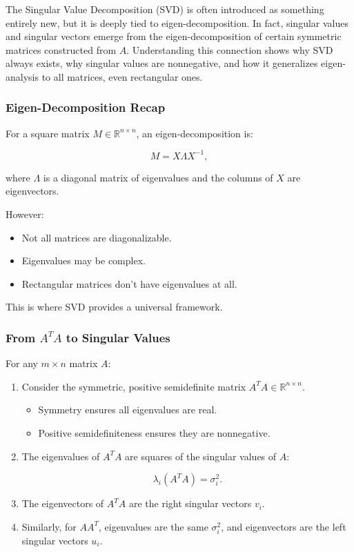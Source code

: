 \documentclass[
  letterpaper,
  DIV=11,
  numbers=noendperiod]{scrreprt}
\providecommand{\tightlist}{%
  \setlength{\itemsep}{0pt}\setlength{\parskip}{0pt}}
\begin{document}
The Singular Value Decomposition (SVD) is often introduced as something
entirely new, but it is deeply tied to eigen-decomposition. In fact,
singular values and singular vectors emerge from the eigen-decomposition
of certain symmetric matrices constructed from \(A\). Understanding this
connection shows why SVD always exists, why singular values are
nonnegative, and how it generalizes eigen-analysis to all matrices, even
rectangular ones.

\subsubsection{Eigen-Decomposition
Recap}\label{eigen-decomposition-recap}

For a square matrix \(M \in \mathbb{R}^{n \times n}\), an
eigen-decomposition is:

\[
M = X \Lambda X^{-1},
\]

where \(\Lambda\) is a diagonal matrix of eigenvalues and the columns of
\(X\) are eigenvectors.

However:

\begin{itemize}
\tightlist
\item
  Not all matrices are diagonalizable.
\item
  Eigenvalues may be complex.
\item
  Rectangular matrices don't have eigenvalues at all.
\end{itemize}

This is where SVD provides a universal framework.

\subsubsection{\texorpdfstring{From \(A^T A\) to Singular
Values}{From A\^{}T A to Singular Values}}\label{from-at-a-to-singular-values}

For any \(m \times n\) matrix \(A\):

\begin{enumerate}
\def\labelenumi{\arabic{enumi}.}
\item
  Consider the symmetric, positive semidefinite matrix
  \(A^T A \in \mathbb{R}^{n \times n}\).

  \begin{itemize}
  \tightlist
  \item
    Symmetry ensures all eigenvalues are real.
  \item
    Positive semidefiniteness ensures they are nonnegative.
  \end{itemize}
\item
  The eigenvalues of \(A^T A\) are squares of the singular values of
  \(A\):

  \[
  \lambda_i(A^T A) = \sigma_i^2.
  \]
\item
  The eigenvectors of \(A^T A\) are the right singular vectors \(v_i\).
\item
  Similarly, for \(AA^T\), eigenvalues are the same \(\sigma_i^2\), and
  eigenvectors are the left singular vectors \(u_i\).
\end{enumerate}
\end{document}
